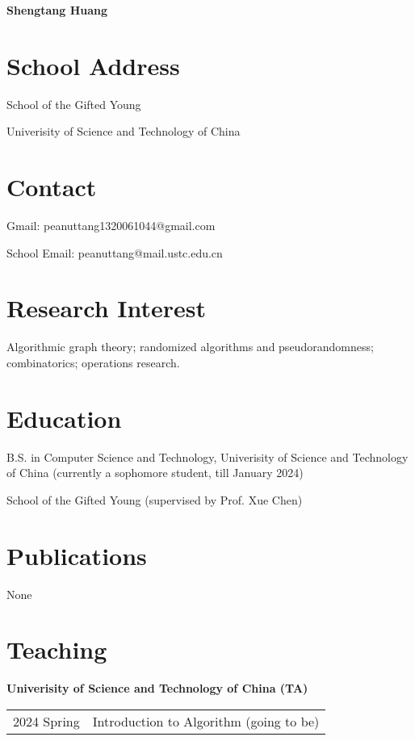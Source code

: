 \documentclass[12pt,a4paper,oneside]{ctexart}
\begin{document}
\begin{center}
    \Large \textbf{Shengtang Huang}
\end{center}

\section*{School Address}

\footnotesize

School of the Gifted Young

Univerisity of Science and Technology of China

\section*{Contact}

Gmail: peanuttang1320061044@gmail.com

School Email: peanuttang@mail.ustc.edu.cn

\section*{Research Interest}

Algorithmic graph theory; randomized algorithms and pseudorandomness; combinatorics; operations research.

\section*{Education}

B.S. in Computer Science and Technology, Univerisity of Science and Technology of China (currently a sophomore student, till January 2024)

School of the Gifted Young (supervised by Prof. Xue Chen)

\section*{Publications}

None

\section*{Teaching}

\textbf{Univerisity of Science and Technology of China (TA)}

\begin{tabular}{cc}
    2024 Spring & Introduction to Algorithm (going to be)
\end{tabular}
\end{document}
